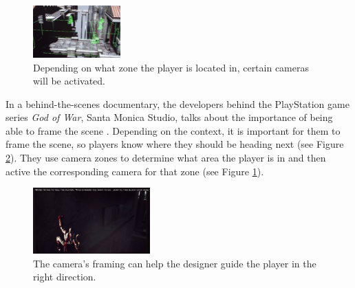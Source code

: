 

\begin{figure}[htbp]
\centering
\includegraphics[width=0.30\textwidth]{Pics/gow_cameraZones}
\caption{Depending on what zone the player is located in, certain cameras will be activated.}
\label{fig:gow_zones}
\end{figure}

In a behind-the-scenes documentary, the developers behind the PlayStation game series \textit{God of War}, Santa Monica Studio, talks about the importance of being able to frame the scene \cite{gow_camera}. Depending on the context, it is important for them to frame the scene, so players know where they should be heading next (see Figure \ref{fig:gow_jump}). They use camera zones to determine what area the player is in and then active the corresponding camera for that zone (see Figure \ref{fig:gow_zones}).

\begin{figure}[htbp]
\centering
\includegraphics[width=0.40\textwidth]{Pics/gow_next}
\caption{The camera's framing can help the designer guide the player in the right direction.}
\label{fig:gow_jump}
\end{figure}


